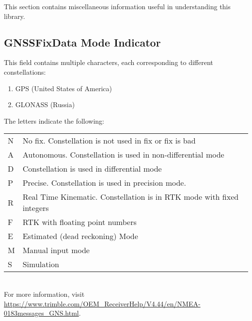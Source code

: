 
This section contains miscellaneous information useful in understanding
this library.

\subsection{GNSSFixData Mode Indicator} \label{gns-extra}

This field contains multiple characters, each corresponding to different constellations:

\begin{enumerate}
	\item GPS (United States of America)
	\item GLONASS (Russia)
\end{enumerate}

The letters indicate the following: \\

\begin{tabular}{|l l|}
	N & No fix. Constellation is not used in fix or fix is bad \\
	A & Autonomous. Constellation is used in non-differential mode \\
	D & Constellation is used in differential mode \\
	P & Precise. Constellation is used in precision mode. \\
	R & Real Time Kinematic. Constellation is in RTK mode with fixed integers \\
	F & RTK with floating point numbers \\
	E & Estimated (dead reckoning) Mode \\
	M & Manual input mode \\
	S & Simulation \\
\end{tabular}
\\

For more information, visit \url{https://www.trimble.com/OEM_ReceiverHelp/V4.44/en/NMEA-0183messages_GNS.html}.

